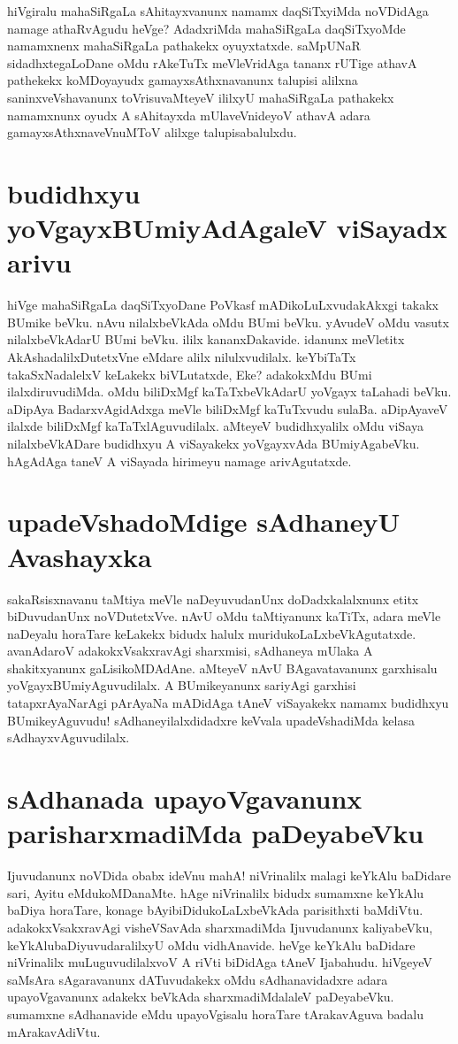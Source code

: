 hiVgiralu mahaSiRgaLa sAhitayxvanunx namamx daqSiTxyiMda noVDidAga namage athaRvAgudu heVge? AdadxriMda mahaSiRgaLa daqSiTxyoMde namamxnenx mahaSiRgaLa pathakekx oyuyxtatxde. saMpUNaR sidadhxtegaLoDane oMdu rAkeTuTx meVleVridAga tananx rUTige athavA pathekekx koMDoyayudx gamayxsAthxnavanunx talupisi alilxna saninxveVshavanunx toVrisuvaMteyeV ililxyU mahaSiRgaLa pathakekx namamxnunx oyudx A sAhitayxda mUlaveVnideyoV athavA adara gamayxsAthxnaveVnuMToV alilxge talupisabalulxdu. 

\section*{budidhxyu yoVgayxBUmiyAdAgaleV viSayadx arivu}

hiVge mahaSiRgaLa daqSiTxyoDane PoVkasf mADikoLuLxvudakAkxgi takakx BUmike beVku. nAvu nilalxbeVkAda oMdu BUmi beVku. yAvudeV oMdu vasutx nilalxbeVkAdarU BUmi beVku. ililx kananxDakavide. idanunx meVletitx AkAshadalilxDutetxVne eMdare alilx nilulxvudilalx. keYbiTaTx takaSxNadalelxV keLakekx biVLutatxde, Eke? adakokxMdu BUmi ilalxdiruvudiMda. oMdu biliDxMgf kaTaTxbeVkAdarU yoVgayx taLahadi beVku. aDipAya BadarxvAgidAdxga meVle biliDxMgf kaTuTxvudu sulaBa. aDipAyaveV ilalxde biliDxMgf kaTaTxlAguvudilalx. aMteyeV budidhxyalilx oMdu viSaya nilalxbeVkADare budidhxyu A viSayakekx yoVgayxvAda BUmiyAgabeVku. hAgAdAga taneV A viSayada hirimeyu namage arivAgutatxde. 

\section*{upadeVshadoMdige sAdhaneyU Avashayxka}

sakaRsisxnavanu taMtiya meVle naDeyuvudanUnx doDadxkalalxnunx etitx biDuvudanUnx noVDutetxVve. nAvU oMdu taMtiyanunx kaTiTx, adara meVle naDeyalu horaTare keLakekx bidudx halulx muridukoLaLxbeVkAgutatxde. avanAdaroV adakokxVsakxravAgi sharxmisi, sAdhaneya mUlaka A shakitxyanunx gaLisikoMDAdAne. aMteyeV nAvU BAgavatavanunx garxhisalu yoVgayxBUmiyAguvudilalx. A BUmikeyanunx sariyAgi garxhisi tatapxrAyaNarAgi pArAyaNa mADidAga tAneV viSayakekx namamx budidhxyu BUmikeyAguvudu! sAdhaneyilalxdidadxre keVvala upadeVshadiMda kelasa sAdhayxvAguvudilalx.

\section*{sAdhanada upayoVgavanunx parisharxmadiMda paDeyabeVku}

Ijuvudanunx noVDida obabx ideVnu mahA! niVrinalilx malagi keYkAlu baDidare sari, Ayitu eMdukoMDanaMte. hAge niVrinalilx bidudx sumamxne keYkAlu baDiya horaTare, konage bAyibiDidukoLaLxbeVkAda parisithxti baMdiVtu. adakokxVsakxravAgi visheVSavAda sharxmadiMda Ijuvudanunx kaliyabeVku, keYkAlubaDiyuvudaralilxyU oMdu vidhAnavide. heVge keYkAlu baDidare niVrinalilx muLuguvudilalxvoV A riVti biDidAga tAneV Ijabahudu. hiVgeyeV saMsAra sAgaravanunx dATuvudakekx oMdu sAdhanavidadxre adara upayoVgavanunx adakekx beVkAda sharxmadiMdalaleV paDeyabeVku. sumamxne sAdhanavide eMdu upayoVgisalu horaTare tArakavAguva badalu mArakavAdiVtu.

